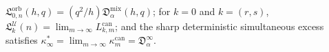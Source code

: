\(\mathfrak L_{0,n}^{\mathrm{orb}}(h,q)=(q^2/h)\mathfrak D_{\alpha}^{\mathrm{mix}}(h,q)\); for \(k=0\) and \(k=(r,s)\), \(\mathfrak L_k^{\mathcal U}(n)=\lim_{m\to\infty}L_{k,m}^{\mathrm{can}}\); and the sharp deterministic simultaneous excess satisfies \(\kappa_\infty^*=\lim_{m\to\infty}\kappa_m^{\mathrm{can}}=\mathfrak D_\alpha^\infty\).